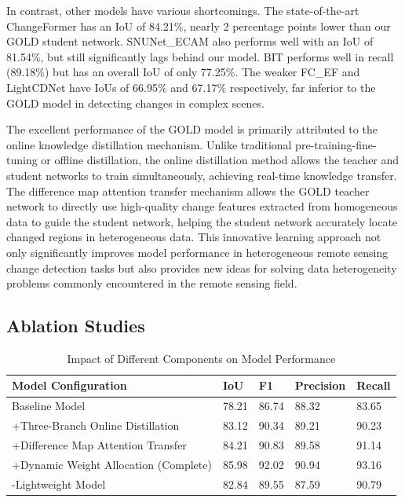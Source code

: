 \documentclass[a4paper,fleqn]{cas-dc}
\begin{document}
In contrast, other models have various shortcomings. The state-of-the-art ChangeFormer has an IoU of 84.21\%, nearly 2 percentage points lower than our GOLD student network. SNUNet\_ECAM also performs well with an IoU of 81.54\%, but still significantly lags behind our model. BIT performs well in recall (89.18\%) but has an overall IoU of only 77.25\%. The weaker FC\_EF and LightCDNet have IoUs of 66.95\% and 67.17\% respectively, far inferior to the GOLD model in detecting changes in complex scenes.

The excellent performance of the GOLD model is primarily attributed to the online knowledge distillation mechanism. Unlike traditional pre-training-fine-tuning or offline distillation, the online distillation method allows the teacher and student networks to train simultaneously, achieving real-time knowledge transfer. The difference map attention transfer mechanism allows the GOLD teacher network to directly use high-quality change features extracted from homogeneous data to guide the student network, helping the student network accurately locate changed regions in heterogeneous data. This innovative learning approach not only significantly improves model performance in heterogeneous remote sensing change detection tasks but also provides new ideas for solving data heterogeneity problems commonly encountered in the remote sensing field.

\subsection{Ablation Studies}
\begin{table}[htbp]
\centering
\caption{Impact of Different Components on Model Performance}
\begin{tabular}{lllll}
\hline
Model Configuration & IoU & F1 & Precision & Recall \\
\hline
Baseline Model & 78.21 & 86.74 & 88.32 & 83.65 \\
+Three-Branch Online Distillation & 83.12 & 90.34 & 89.21 & 90.23 \\
+Difference Map Attention Transfer & 84.21 & 90.83 & 89.58 & 91.14 \\
+Dynamic Weight Allocation (Complete) & 85.98 & 92.02 & 90.94 & 93.16 \\
-Lightweight Model & 82.84 & 89.55 & 87.59 & 90.79 \\
\hline
\end{tabular}
\label{tab:ablation}
\end{table}
\end{document}
